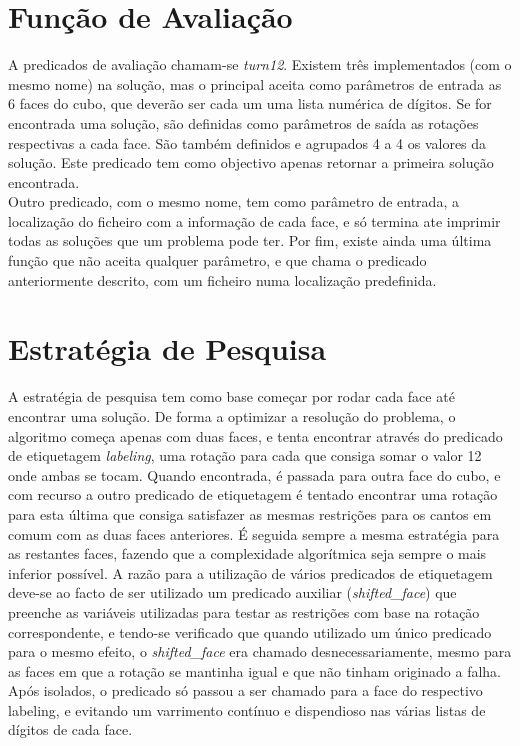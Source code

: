 \section{Função de Avaliação}
\label{restr:3}

A predicados de avaliação chamam-se \textit{turn12}. Existem três implementados (com o mesmo nome) na solução, mas o principal aceita como parâmetros de entrada as 6 faces do cubo, que deverão ser cada um uma lista numérica de dígitos. Se for encontrada uma solução, são definidas como parâmetros de saída as rotações respectivas a cada face. São também definidos e agrupados 4 a 4 os valores da solução. Este predicado tem como objectivo apenas retornar a primeira solução encontrada.\\
Outro predicado, com o mesmo nome, tem como parâmetro de entrada, a localização do ficheiro com a informação de cada face, e só termina ate imprimir todas as soluções que um problema pode ter.
Por fim, existe ainda uma última função que não aceita qualquer parâmetro, e que chama o predicado anteriormente descrito, com um ficheiro numa localização predefinida.


\section{Estratégia de Pesquisa}
\label{rest:4}

A estratégia de pesquisa tem como base começar por rodar cada face até encontrar uma solução.
De forma a optimizar a resolução do problema, o algoritmo começa apenas com duas faces, e tenta encontrar através do predicado de etiquetagem \textit{labeling}, uma rotação para cada que consiga somar o valor 12 onde ambas se tocam.
Quando encontrada, é passada para outra face do cubo, e com recurso a outro predicado de etiquetagem é tentado encontrar uma rotação para esta última que consiga satisfazer as mesmas restrições para os cantos em comum com as duas faces anteriores. É seguida sempre a mesma estratégia para as restantes faces, fazendo que a complexidade algorítmica seja sempre o mais inferior possível.
A razão para a utilização de vários predicados de etiquetagem deve-se ao facto de ser utilizado um predicado auxiliar (\textit{shifted\_face}) que preenche as variáveis utilizadas para testar as restrições com base na rotação correspondente, e tendo-se verificado que quando utilizado um único predicado para o mesmo efeito, o \textit{shifted\_face} era chamado desnecessariamente, mesmo para as faces em que a rotação se mantinha igual e que não tinham originado a falha.
Após isolados, o predicado só passou a ser chamado para a face do respectivo labeling, e evitando um varrimento contínuo e dispendioso nas várias listas de dígitos de cada face.

%

